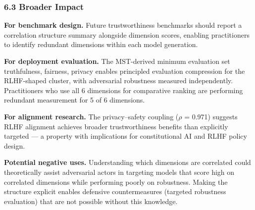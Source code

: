 \subsubsection{6.3 Broader Impact}

\textbf{For benchmark design.} Future trustworthiness benchmarks should report a correlation structure summary alongside dimension scores, enabling practitioners to identify redundant dimensions within each model generation.

\textbf{For deployment evaluation.} The MST-derived minimum evaluation set {truthfulness, fairness, privacy} enables principled evaluation compression for the RLHF-shaped cluster, with adversarial robustness measured independently. Practitioners who use all 6 dimensions for comparative ranking are performing redundant measurement for 5 of 6 dimensions.

\textbf{For alignment research.} The privacy--safety coupling ($\rho$ = 0.971) suggests RLHF alignment achieves broader trustworthiness benefits than explicitly targeted --- a property with implications for constitutional AI and RLHF policy design.

\textbf{Potential negative uses.} Understanding which dimensions are correlated could theoretically assist adversarial actors in targeting models that score high on correlated dimensions while performing poorly on robustness. Making the structure explicit enables defensive countermeasures (targeted robustness evaluation) that are not possible without this knowledge.

